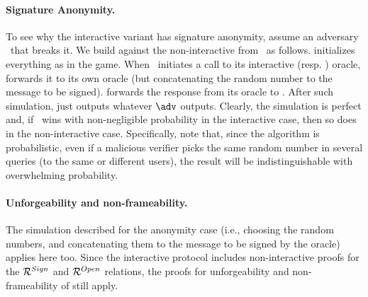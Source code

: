 \paragraph{Signature Anonymity.} To see why the interactive variant has
signature anonymity, assume an adversary \adv~that breaks it. We build \advB
against the non-interactive \ExpSigAnonb from \adv~as follows. \advB initializes
everything as in the \ExpSigAnonb game. When \adv~initiates a call to its
interactive \SIGN (resp. \CHALb) oracle, \advB forwards it to its own oracle
(but concatenating the random number to the message to be signed). \advB
forwards the response from its oracle to \adv. After such simulation, \advB just
outputs whatever $\adv$ outputs. Clearly, the simulation is perfect and, if
\adv~wins with non-negligible probability in the interactive case, then so
does \advB in the non-interactive case. Specifically, note that, since the \Sign
algorithm is probabilistic, even if a malicious verifier picks the same random
number in several queries (to the same or different users), the result will be
indistinguishable with overwhelming probability.

\paragraph{Unforgeability and non-frameability.} The simulation described for
the anonymity case (i.e., \advB choosing the random numbers, and concatenating
them to the message to be signed by the oracle) applies here too. Since the
interactive protocol includes non-interactive proofs for the $\mathcal{R}^{Sign}$
and $\mathcal{R}^{Open}$ relations, the proofs for unforgeability and
non-frameability of \CUASGen still apply.

